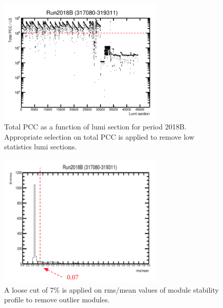 \begin{figure}[!htp]
\centering
\includegraphics[width=0.7\textwidth]{ashish_thesis/Run2018B_totalPCC_cut.png}
\caption{%
 Total PCC as a function of lumi section for period 2018B.  Appropriate selection on total PCC is applied to remove low statistics lumi sections.
}
\label{fig:PCC_cut}
\end{figure}


\begin{figure}[!htp]
\centering
\includegraphics[width=0.7\textwidth]{ashish_thesis/first_iteration.png}
\caption{%
   A loose cut of 7\% is applied on rms/mean values of module stability profile to remove outlier modules.
}
\label{fig:f_it}
\end{figure}




